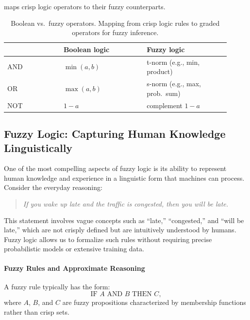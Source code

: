  maps crisp logic operators to their fuzzy counterparts.

\begin{table}[t]
\centering
\caption{Boolean vs.\ fuzzy operators. Mapping from crisp logic rules to graded operators for fuzzy inference.}
\label{tab:boolean-vs-fuzzy}
\small
\begin{tabular}{@{}p{0.23\linewidth} >{\raggedright\arraybackslash}p{0.34\linewidth} >{\raggedright\arraybackslash}p{0.34\linewidth}@{}}
\toprule
 & \textbf{Boolean logic} & \textbf{Fuzzy logic} \\
\midrule
AND & \(\min(a, b)\) & t\hyp{}norm (e.g., min, product) \\
OR & \(\max(a, b)\) & s\hyp{}norm (e.g., max, prob.\ sum) \\
NOT & \(1-a\) & complement \(1-a\) \\
\bottomrule
\end{tabular}
\end{table}

\FloatBarrier

\subsection{Fuzzy Logic: Capturing Human Knowledge Linguistically}
\label{sec:softcomp_fuzzy_logic_capturing_human_knowledge_linguistically}

One of the most compelling aspects of fuzzy logic is its ability to represent human knowledge and experience in a linguistic form that machines can process. Consider the everyday reasoning:

\begin{quote}
\textit{If you wake up late and the traffic is congested, then you will be late.}
\end{quote}

This statement involves vague concepts such as ``late,'' ``congested,'' and ``will be late,'' which are not crisply defined but are intuitively understood by humans. Fuzzy logic allows us to formalize such rules without requiring precise probabilistic models or extensive training data.

\paragraph{Fuzzy Rules and Approximate Reasoning}

A fuzzy rule typically has the form:
\[
    \text{IF } A \text{ AND } B \text{ THEN } C,
\]
where $A$, $B$, and $C$ are fuzzy propositions characterized by membership functions rather than crisp sets.

